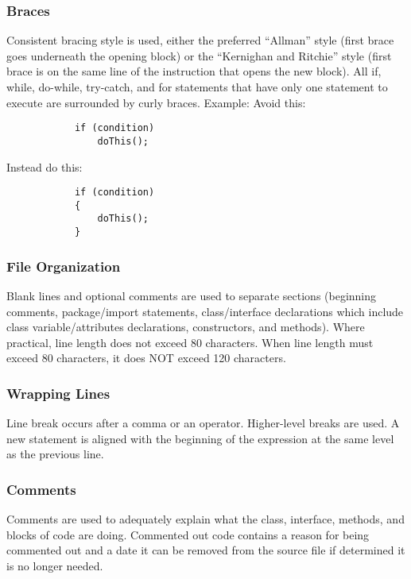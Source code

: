 \subsubsection{Braces}
\begin{itemize}
		Consistent bracing style is used, either the preferred “Allman” style (first brace goes underneath the opening block) or the “Kernighan and Ritchie” style (first brace is on the same line of the instruction that opens the new block).
		All if, while, do-while, try-catch, and for statements that have only one statement to execute are surrounded by curly braces. Example:
		Avoid this:
		\begin{lstlisting}
			if (condition) 
				doThis();
		\end{lstlisting}
		Instead do this:
		\begin{lstlisting}
			if (condition) 
			{
				doThis();
			}
		\end{lstlisting}
\end{itemize}
%
\subsubsection{File Organization}
\begin{itemize}
		Blank lines and optional comments are used to separate sections (beginning comments, package/import statements, class/interface declarations which include class variable/attributes declarations, constructors, and methods).
		Where practical, line length does not exceed 80 characters.
		When line length must exceed 80 characters, it does NOT exceed 120 characters.
\end{itemize}
%
\subsubsection{Wrapping Lines}
\begin{itemize}
		Line break occurs after a comma or an operator.
		Higher-level breaks are used.
		A new statement is aligned with the beginning of the expression at the same level as the previous line.
\end{itemize}
%
\subsubsection{Comments}
\begin{itemize}
		Comments are used to adequately explain what the class, interface, methods, and blocks of code are doing.
		Commented out code contains a reason for being commented out and a date it can be removed from the source file if determined it is no longer needed.
\end{itemize}
%
